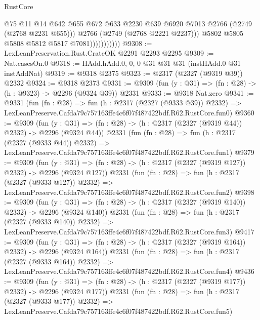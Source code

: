 \begin{lexlean}{RustCore}
\begin{coremodule}
                              @75
                              @11
                              @14
                              @642
                              @655
                              @672
                              @633
                              @2230
                              @639
                              @6920
                              @7013
                              @2766
                              (@2749 (@2768 @2231 @655)))
                            @2766
                            (@2749 (@2768 @2221 @2237)))
                          @5802
                          @5805
                          @5808
                          @5812
                          @5817
                          @7081)))))))))))
@9308 := LexLeanPreservation.Rust.CrateOK @2291 @2293 @2295
@9309 := Nat.casesOn.{0}
@9318 := HAdd.hAdd.{0, 0, 0} @31 @31 @31 (instHAdd.{0} @31 instAddNat)
@9319 := @9318 @2375
@9323 := @2317 (@2327 (@9319 @39)) @2332
@9324 := @9318 @2373
@9331 := @9309 (fun (y : @31) => (fn : @28) -> (h : @9323) -> @2296 (@9324 @39)) @2331
@9333 := @9318 Nat.zero
@9341 := @9331
    (fun (fn : @28) =>
    fun (h : @2317 (@2327 (@9333 @39)) @2332) =>
    LexLeanPreserve.Cafda79c757163ffe4c6f07f487422bdf.R62.RustCore.fun0)
@9360 := @9309
    (fun (y : @31) => (fn : @28) -> (h : @2317 (@2327 (@9319 @44)) @2332) -> @2296 (@9324 @44))
    @2331
    (fun (fn : @28) =>
    fun (h : @2317 (@2327 (@9333 @44)) @2332) =>
    LexLeanPreserve.Cafda79c757163ffe4c6f07f487422bdf.R62.RustCore.fun1)
@9379 := @9309
    (fun (y : @31) => (fn : @28) -> (h : @2317 (@2327 (@9319 @127)) @2332) -> @2296 (@9324 @127))
    @2331
    (fun (fn : @28) =>
    fun (h : @2317 (@2327 (@9333 @127)) @2332) =>
    LexLeanPreserve.Cafda79c757163ffe4c6f07f487422bdf.R62.RustCore.fun2)
@9398 := @9309
    (fun (y : @31) => (fn : @28) -> (h : @2317 (@2327 (@9319 @140)) @2332) -> @2296 (@9324 @140))
    @2331
    (fun (fn : @28) =>
    fun (h : @2317 (@2327 (@9333 @140)) @2332) =>
    LexLeanPreserve.Cafda79c757163ffe4c6f07f487422bdf.R62.RustCore.fun3)
@9417 := @9309
    (fun (y : @31) => (fn : @28) -> (h : @2317 (@2327 (@9319 @164)) @2332) -> @2296 (@9324 @164))
    @2331
    (fun (fn : @28) =>
    fun (h : @2317 (@2327 (@9333 @164)) @2332) =>
    LexLeanPreserve.Cafda79c757163ffe4c6f07f487422bdf.R62.RustCore.fun4)
@9436 := @9309
    (fun (y : @31) => (fn : @28) -> (h : @2317 (@2327 (@9319 @177)) @2332) -> @2296 (@9324 @177))
    @2331
    (fun (fn : @28) =>
    fun (h : @2317 (@2327 (@9333 @177)) @2332) =>
    LexLeanPreserve.Cafda79c757163ffe4c6f07f487422bdf.R62.RustCore.fun5)

\end{coremodule}
\end{lexlean}
